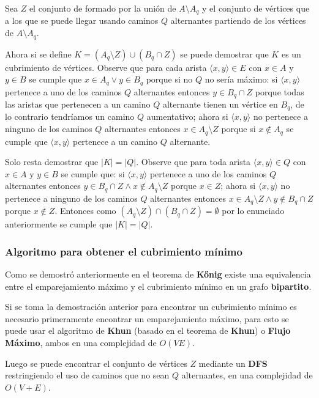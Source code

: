 \documentclass{article}
\begin{document}
Sea $Z$ el conjunto de formado por la unión de $A \setminus A_q$ y el conjunto de vértices que a los que se puede llegar usando
caminos $Q$ alternantes partiendo de los vértices de $A \setminus A_q$.

Ahora si se define $K = (A_q\setminus Z) \cup (B_q \cap Z)$ se puede demostrar que $K$ es un cubrimiento de vértices. Observe que
para cada arista $\langle x, y \rangle \in E$ con $x\in A$ y $y\in B$ se cumple que $x \in A_q \vee y \in B_q$ porque si no $Q$
no sería máximo: si $\langle x, y \rangle$ pertenece a uno de los caminos $Q$ alternantes entonces $y \in B_q \cap Z$ porque todas las aristas
que pertenecen a un camino $Q$ alternante tienen un vértice en $B_q$, de lo contrario tendríamos un camino $Q$ aumentativo; ahora si $\langle x, y \rangle$
no pertenece a ninguno de los caminos $Q$ alternantes entonces $x \in A_q\setminus Z$ porque si $x \notin A_q$ se cumple que $\langle x, y \rangle$
pertenece a un camino $Q$ alternante.

Solo resta demostrar que $|K|=|Q|$. Observe que para toda arista $\langle x, y \rangle \in Q$ con $x\in A$ y $y\in B$
se cumple que: si $\langle x, y \rangle$ pertenece a uno de los caminos $Q$ alternantes entonces $y \in B_q \cap Z \wedge x \notin A_q\setminus Z$ porque $x\in Z$;
ahora si $\langle x, y \rangle$ no pertenece a ninguno de los caminos $Q$ alternantes entonces $x \in A_q\setminus Z \wedge y \notin B_q \cap Z$ porque $x \notin Z$.
Entonces como $(A_q\setminus Z) \cap (B_q \cap Z)= \emptyset$ por lo enunciado anteriormente se cumple que $|K|=|Q|$.

\subsubsection{Algoritmo para obtener el cubrimiento mínimo}

Como se demostró anteriormente en el teorema de \textbf{Kőnig} existe una equivalencia entre el emparejamiento máximo y
el cubrimiento mínimo en un grafo \textbf{bipartito}.

Si se toma la demostración anterior para encontrar un cubrimiento mínimo es necesario primeramente encontrar un emparejamiento
máximo, para esto se puede usar el algoritmo de \textbf{Khun} (basado en el teorema de \textbf{Khun})
o \textbf{Flujo Máximo}, ambos en una complejidad de $O(VE)$.

Luego se puede encontrar el conjunto de vértices $Z$ mediante un \textbf{DFS} restringiendo el uso de caminos que no sean
$Q$ alternantes, en una complejidad de $O(V+E)$.
\end{document}
